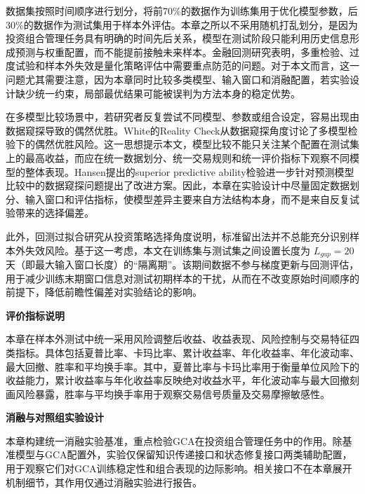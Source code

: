 数据集按照时间顺序进行划分，将前70\%的数据作为训练集用于优化模型参数，后30\%的数据作为测试集用于样本外评估。本章之所以不采用随机打乱划分，是因为投资组合管理任务具有明确的时间先后关系，模型在测试阶段只能利用历史信息形成预测与权重配置，而不能提前接触未来样本。金融回测研究表明，多重检验、过度试验和样本外失效是量化策略评估中需要重点防范的问题\cite{harvey2016backtesting}。对于本文而言，这一问题尤其需要注意，因为本章同时比较多类模型、输入窗口和消融配置，若实验设计缺少统一约束，局部最优结果可能被误判为方法本身的稳定优势。

在多模型比较场景中，若研究者反复尝试不同模型、参数或组合设定，容易出现由数据窥探导致的偶然优胜。White的Reality Check从数据窥探角度讨论了多模型检验下的偶然优胜风险\cite{white2000realitycheck}。这一思想提示本文，模型比较不能只关注某个配置在测试集上的最高收益，而应在统一数据划分、统一交易规则和统一评价指标下观察不同模型的整体表现。Hansen提出的superior predictive ability检验进一步针对预测模型比较中的数据窥探问题提出了改进方案\cite{hansen2005spa}。因此，本章在实验设计中尽量固定数据划分、输入窗口和评估指标，使模型差异主要来自方法结构本身，而不是来自反复试验带来的选择偏差。

此外，回测过拟合研究从投资策略选择角度说明，标准留出法并不总能充分识别样本外失效风险\cite{bailey2015pbo}。基于这一考虑，本文在训练集与测试集之间设置长度为 $L_{gap}=20$ 天（即最大输入窗口长度）的“隔离期”。该期间数据不参与梯度更新与回测评估，用于减少训练末期窗口信息对测试初期样本的干扰，从而在不改变原始时间顺序的前提下，降低前瞻性偏差对实验结论的影响。

\noindent\textbf{评价指标说明}\par
本章在样本外测试中统一采用风险调整后收益、收益表现、风险控制与交易特征四类指标。具体包括夏普比率、卡玛比率、累计收益率、年化收益率、年化波动率、最大回撤、胜率和平均换手率。其中，夏普比率与卡玛比率用于衡量单位风险下的收益能力，累计收益率与年化收益率反映绝对收益水平，年化波动率与最大回撤刻画风险暴露，胜率与平均换手率用于观察交易信号质量及交易摩擦敏感性。



\noindent\textbf{消融与对照组实验设计}\par


本章构建统一消融实验基准，重点检验GCA在投资组合管理任务中的作用。除基准模型与GCA配置外，实验仅保留知识传递接口和状态修复接口两类辅助配置，用于观察它们对GCA训练稳定性和组合表现的边际影响。相关接口不在本章展开机制细节，其作用仅通过消融实验进行报告。

